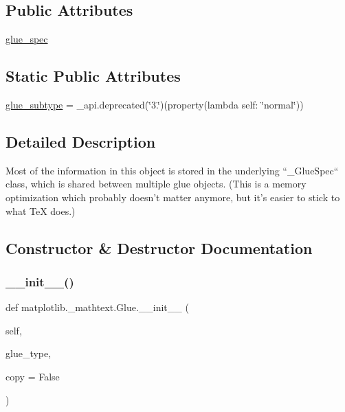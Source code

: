 \subsection*{Public Attributes}
\begin{DoxyCompactItemize}
\item 
\hyperlink{classmatplotlib_1_1__mathtext_1_1Glue_ae91ca816ce61653b8490070ab546fed0}{glue\+\_\+spec}
\end{DoxyCompactItemize}
\subsection*{Static Public Attributes}
\begin{DoxyCompactItemize}
\item 
\hyperlink{classmatplotlib_1_1__mathtext_1_1Glue_a13e58f4238573cd2fc6b674b62181243}{glue\+\_\+subtype} = \+\_\+api.\+deprecated(\char`\"{}3.\char`\"{})(property(lambda self\+: \char`\"{}normal\char`\"{}))
\end{DoxyCompactItemize}


\subsection{Detailed Description}
\begin{DoxyVerb}Most of the information in this object is stored in the underlying
``_GlueSpec`` class, which is shared between multiple glue objects.
(This is a memory optimization which probably doesn't matter anymore, but
it's easier to stick to what TeX does.)
\end{DoxyVerb}
 

\subsection{Constructor \& Destructor Documentation}
\mbox{\label{classmatplotlib_1_1__mathtext_1_1Glue_a7c2aec847b25450593aa03a6cad4a184}} 
\subsubsection{\texorpdfstring{\+\_\+\+\_\+init\+\_\+\+\_\+()}{\_\_init\_\_()}}
{\footnotesize\ttfamily def matplotlib.\+\_\+mathtext.\+Glue.\+\_\+\+\_\+init\+\_\+\+\_\+ (\begin{DoxyParamCaption}\item[{}]{self,  }\item[{}]{glue\+\_\+type,  }\item[{}]{copy = {\ttfamily False} }\end{DoxyParamCaption})}



